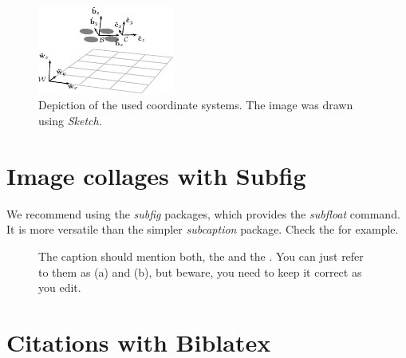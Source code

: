 \begin{figure}[htbp]
  \centering
  \includegraphics[width=0.4\textwidth]{./fig/sketch/coordinate_frames.pdf}
  \caption{Depiction of the used coordinate systems. The image was drawn using \emph{Sketch}.}
  \label{fig:coordinate_systems}
\end{figure}

\section{Image collages with Subfig}

We recommend using the \emph{subfig} packages, which provides the \emph{subfloat} command.
It is more versatile than the simpler \emph{subcaption} package.
Check the  for example.

\begin{figure}[htbp]
  \centering
  \caption{The caption should mention both, the  and the . You can just refer to them as (a) and (b), but beware, you need to keep it correct as you edit.}
  \label{fig:uavs}
\end{figure}

\section{Citations with Biblatex}

